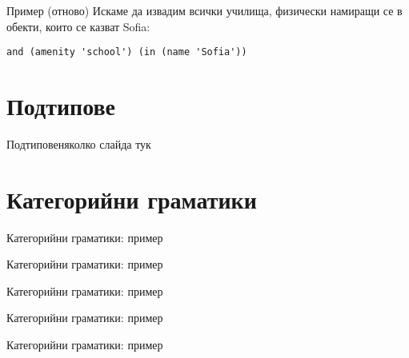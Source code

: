\documentclass[9pt]{beamer}
\begin{document}
  \begin{frame}[fragile]{Пример (отново)}
    Искаме да извадим всички училища, физически намиращи се в обекти,
    които се казват Sofia:
    \begin{lstwrap}\begin{lstlisting}
and (amenity 'school') (in (name 'Sofia'))
    \end{lstlisting}\end{lstwrap}
  \end{frame}


  \section{Подтипове}
  \begin{frame}{Подтипове}няколко слайда тук\end{frame}

  \section{Категорийни граматики}
  \begin{frame}{Категорийни граматики: пример}
  \end{frame}

  \begin{frame}{Категорийни граматики: пример}
  \end{frame}
  \begin{frame}{Категорийни граматики: пример}
  \end{frame}
  \begin{frame}{Категорийни граматики: пример}
  \end{frame}
  \begin{frame}{Категорийни граматики: пример}
  \end{frame}
\end{document}
